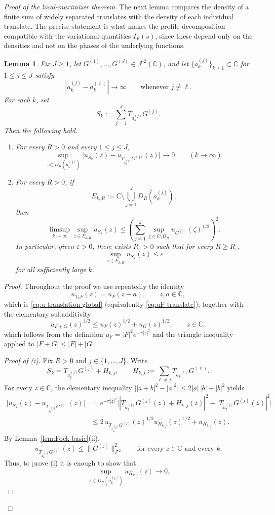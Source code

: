 \documentclass[a4paper,11pt,reqno]{amsart}
\numberwithin{equation}{section}
\theoremstyle{plain} %
\newtheorem{lemma}{Lemma}[section]
\theoremstyle{definition} %
\theoremstyle{remark}
\newcommand{\C}{\mathbb{C}}
\begin{document}
\begin{proof}[Proof of the local-maximizer theorem]
The next lemma compares the density of a finite sum of widely separated
translates with the density of each individual translate. The precise statement
is what makes the profile decomposition compatible with the variational
quantities \(I_F(s)\), since these depend only on the densities and not on
the phases of the underlying functions.

\begin{lemma}\label{lem:pointwise-decoupling-global}
Fix \(J\ge 1\), let \(G^{(1)},\dots,G^{(J)}\in \mathcal F^2(\C)\), and let
\(\{a_k^{(j)}\}_{k\ge 1}\subset \C\) for \(1\le j\le J\) satisfy
\[
|a_k^{(j)}-a_k^{(\ell)}|\to\infty
\qquad\text{whenever }j\neq \ell.
\]
For each \(k\), set
\[
S_k:=\sum_{j=1}^J T_{a_k^{(j)}}G^{(j)}.
\]
Then the following hold.
\begin{enumerate}
\item[(i)] For every \(R>0\) and every \(1\le j\le J\),
\[
\sup_{z\in D_R(a_k^{(j)})}
\big|u_{S_k}(z)-u_{T_{a_k^{(j)}}G^{(j)}}(z)\big|
\to 0
\qquad (k\to\infty).
\]

\item[(ii)] For every \(R>0\), if
\[
E_{k,R}:=\C\setminus \bigcup_{j=1}^J D_R(a_k^{(j)}),
\]
then
\[
\limsup_{k\to\infty}\sup_{z\in E_{k,R}}u_{S_k}(z)
\le
\left(
\sum_{j=1}^J
\sup_{\zeta\in \C\setminus D_R} u_{G^{(j)}}(\zeta)^{1/2}
\right)^2.
\]
In particular, given \(\varepsilon>0\), there exists \(R_\varepsilon>0\) such that
for every \(R\ge R_\varepsilon\),
\[
\sup_{z\in E_{k,R}}u_{S_k}(z)\le \varepsilon
\]
for all sufficiently large \(k\).
\end{enumerate}
\end{lemma}

\begin{proof}
Throughout the proof we use repeatedly the identity
\[
u_{T_a F}(z)=u_F(z-a),
\qquad z,a\in \C,
\]
which is \eqref{eq:u-translation-global} (equivalently
\eqref{eq:uF-translate}); together with the elementary subadditivity
\[
u_{F+G}(z)^{1/2}\le u_F(z)^{1/2}+u_G(z)^{1/2},
\qquad z\in\C,
\]
which follows from the definition \(u_F=|F|^2 e^{-\pi |z|^2}\) and the
triangle inequality applied to \(|F+G|\le |F|+|G|\).

\medskip
\noindent\emph{Proof of (i).}
Fix \(R>0\) and \(j\in\{1,\dots,J\}\). Write
\[
S_k=T_{a_k^{(j)}}G^{(j)}+H_{k,j},
\qquad
H_{k,j}:=\sum_{\ell\neq j} T_{a_k^{(\ell)}}G^{(\ell)}.
\]
For every \(z\in \C\), the elementary inequality
\(\big||a+b|^2-|a|^2\big|\le 2|a|\,|b|+|b|^2\) yields
\begin{align*}
\big|u_{S_k}(z)-u_{T_{a_k^{(j)}}G^{(j)}}(z)\big|
&=
e^{-\pi |z|^2}
\big||T_{a_k^{(j)}}G^{(j)}(z)+H_{k,j}(z)|^2
-|T_{a_k^{(j)}}G^{(j)}(z)|^2\big| \\
&\le
2\,u_{T_{a_k^{(j)}}G^{(j)}}(z)^{1/2}u_{H_{k,j}}(z)^{1/2}
+u_{H_{k,j}}(z).
\end{align*}
By Lemma~\ref{lem:Fock-basic}(ii),
\[
u_{T_{a_k^{(j)}}G^{(j)}}(z)\le \|G^{(j)}\|_{\mathcal F^2}^2
\qquad \text{for every }z\in\C\text{ and every }k.
\]
Thus, to prove (i) it is enough to show that
\[
\sup_{z\in D_R(a_k^{(j)})} u_{H_{k,j}}(z)\to 0.
\]


\end{proof}
\end{proof}
\end{document}
